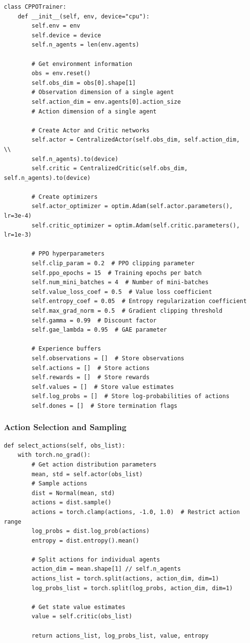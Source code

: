\documentclass[12pt]{article}
\begin{document}
\begin{verbatim}
class CPPOTrainer:
    def __init__(self, env, device="cpu"):
        self.env = env
        self.device = device
        self.n_agents = len(env.agents)
        
        # Get environment information
        obs = env.reset()
        self.obs_dim = obs[0].shape[1]  
        # Observation dimension of a single agent
        self.action_dim = env.agents[0].action_size  
        # Action dimension of a single agent
        
        # Create Actor and Critic networks
        self.actor = CentralizedActor(self.obs_dim, self.action_dim, \\
        self.n_agents).to(device)
        self.critic = CentralizedCritic(self.obs_dim, self.n_agents).to(device)
        
        # Create optimizers
        self.actor_optimizer = optim.Adam(self.actor.parameters(), lr=3e-4)
        self.critic_optimizer = optim.Adam(self.critic.parameters(), lr=1e-3)
        
        # PPO hyperparameters
        self.clip_param = 0.2  # PPO clipping parameter
        self.ppo_epochs = 15  # Training epochs per batch
        self.num_mini_batches = 4  # Number of mini-batches
        self.value_loss_coef = 0.5  # Value loss coefficient
        self.entropy_coef = 0.05  # Entropy regularization coefficient
        self.max_grad_norm = 0.5  # Gradient clipping threshold
        self.gamma = 0.99  # Discount factor
        self.gae_lambda = 0.95  # GAE parameter
        
        # Experience buffers
        self.observations = []  # Store observations
        self.actions = []  # Store actions
        self.rewards = []  # Store rewards
        self.values = []  # Store value estimates
        self.log_probs = []  # Store log-probabilities of actions
        self.dones = []  # Store termination flags
\end{verbatim}

\subsubsection{Action Selection and Sampling}

\begin{verbatim}
def select_actions(self, obs_list):
    with torch.no_grad():
        # Get action distribution parameters
        mean, std = self.actor(obs_list)
        # Sample actions
        dist = Normal(mean, std)
        actions = dist.sample()
        actions = torch.clamp(actions, -1.0, 1.0)  # Restrict action range
        log_probs = dist.log_prob(actions)
        entropy = dist.entropy().mean()
        
        # Split actions for individual agents
        action_dim = mean.shape[1] // self.n_agents
        actions_list = torch.split(actions, action_dim, dim=1)
        log_probs_list = torch.split(log_probs, action_dim, dim=1)
        
        # Get state value estimates
        value = self.critic(obs_list)
        
        return actions_list, log_probs_list, value, entropy
\end{verbatim}
\end{document}
